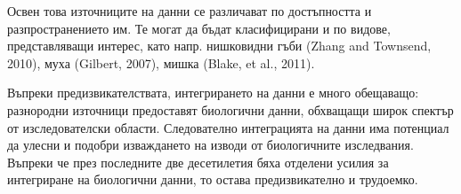 \documentclass[12pt, a4paper, oneside]{book}
\begin{document}
Освен това източниците на данни се различават по достъпността и разпространението им. Те могат да бъдат класифицирани и по видове, представляващи интерес, като напр. нишковидни гъби (Zhang and Townsend, 2010), муха (Gilbert, 2007), мишка (Blake, et al., 2011).\cite{BIOINFORMATICS-TRENDS-AND-METHODOLOGIES}

Въпреки предизвикателствата, интегрирането на данни е много обещаващо: разнородни източници предоставят биологични данни, обхващащи широк спектър от изследователски области. Следователно интеграцията на данни има потенциал да улесни и подобри изваждането на изводи от биологичните изследвания. Въпреки че през последните две десетилетия бяха отделени усилия за интегриране на биологични данни, то остава предизвикателно и трудоемко.\cite{BIOINFORMATICS-TRENDS-AND-METHODOLOGIES}
\end{document}
